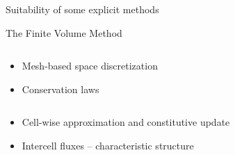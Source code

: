 \begin{frame}{Suitability of some explicit methods}
  \begin{block}{The Finite Volume Method \cite{Leveque}}%
    \vspace{-0.2cm}
    \begin{overprint}
      \vspace{-0.2cm}
      \begin{columns}
        \begin{footnotesize}
          \begin{column}{0.4\textwidth}
            \begin{itemize}
            \item[] Mesh-based space discretization
            \item[] Conservation laws
            \end{itemize}
        \end{column}
        \begin{column}{0.6\textwidth}
            \begin{itemize}
            \item[] Cell-wise approximation and constitutive update
            \item[] Intercell fluxes -- characteristic structure \cite{Godunov_method}
            \end{itemize}
          \end{column}
        \end{footnotesize}
      \end{columns}
      \vspace{3.65cm}
      \vspace{-0.2cm}
      \begin{columns}
        \begin{footnotesize}
          \begin{column}{0.4\textwidth}
            \begin{itemize}

\end{itemize}
\end{column}
\end{footnotesize}
\end{columns}
\end{overprint}
\end{block}
\end{frame}
